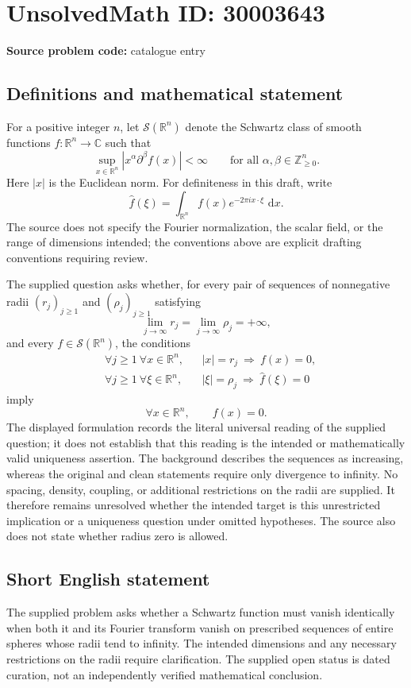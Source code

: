 \documentclass[11pt]{article}
\newcommand{\Z}{\mathbb{Z}}
\newcommand{\R}{\mathbb{R}}
\newcommand{\C}{\mathbb{C}}
\newcommand{\dd}{\,\mathrm{d}}
\begin{document}
\section*{UnsolvedMath ID: 30003643}
\textbf{Source problem code:} catalogue entry
\subsection{Definitions and mathematical statement}
For a positive integer \(n\), let \(\mathcal S(\R^n)\) denote the Schwartz class of smooth functions \(f:\R^n\to\C\) such that
\[
\sup_{x\in\R^n}|x^\alpha\partial^\beta f(x)|<\infty
\qquad\text{for all }\alpha,\beta\in\Z_{\geq0}^n.
\]
Here \(|x|\) is the Euclidean norm. For definiteness in this draft, write
\[
\widehat f(\xi)=\int_{\R^n}f(x)e^{-2\pi i x\cdot\xi}\,\dd x.
\]
The source does not specify the Fourier normalization, the scalar field, or the range of dimensions intended; the conventions above are explicit drafting conventions requiring review.

The supplied question asks whether, for every pair of sequences of nonnegative radii \((r_j)_{j\geq1}\) and \((\rho_j)_{j\geq1}\) satisfying
\[
\lim_{j\to\infty}r_j=\lim_{j\to\infty}\rho_j=+\infty,
\]
and every \(f\in\mathcal S(\R^n)\), the conditions
\[
\begin{aligned}
&\forall j\geq1\ \forall x\in\R^n,
&&|x|=r_j\ \Longrightarrow\ f(x)=0,\\
&\forall j\geq1\ \forall \xi\in\R^n,
&&|\xi|=\rho_j\ \Longrightarrow\ \widehat f(\xi)=0
\end{aligned}
\]
imply
\[
\forall x\in\R^n,\qquad f(x)=0.
\]
The displayed formulation records the literal universal reading of the supplied question; it does not establish that this reading is the intended or mathematically valid uniqueness assertion. The background describes the sequences as increasing, whereas the original and clean statements require only divergence to infinity. No spacing, density, coupling, or additional restrictions on the radii are supplied. It therefore remains unresolved whether the intended target is this unrestricted implication or a uniqueness question under omitted hypotheses. The source also does not state whether radius zero is allowed.
\subsection{Short English statement}
The supplied problem asks whether a Schwartz function must vanish identically when both it and its Fourier transform vanish on prescribed sequences of entire spheres whose radii tend to infinity. The intended dimensions and any necessary restrictions on the radii require clarification. The supplied open status is dated curation, not an independently verified mathematical conclusion.
\end{document}
